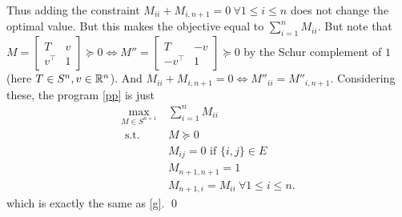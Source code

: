 \begin{enumerate}[leftmargin=*]
\begin{pf}
Thus adding the constraint $M_{ii} + M_{i,n+1}=0~\forall 1\le i\le n$ does not change the optimal value. But this makes the objective equal to $\sum_{i=1}^{n}M_{ii}$. But note that $M = \begin{bmatrix}T&v\\v^{\top}&1\end{bmatrix} \succeq 0 \iff M''=\begin{bmatrix}T&-v\\-v^{\top}&1\end{bmatrix}\succeq 0$ by the Schur complement of $1$ (here $T\in S^{n}, v\in \mathbb{R}^{n}$). And $M_{ii}+M_{i,n+1}=0\iff M''_{ii} = M''_{i,n+1}$.  Considering these, the program \ref{pp} is just
\begin{align*}
\max _{M \in S^{n+1}} &~\sum_{i=1}^{n} M_{i i} \\
\text { s.t. }&~ M\succeq 0\\
&~ M_{ij} = 0 \text { if }\{i, j\} \in E\\
&~ M_{n+1,n+1} = 1\\
&~M_{n+1, i}=M_{i i}~\forall 1\le i \le n.
\end{align*}
which is exactly the same as \ref{g}.
\qed\end{pf}


\end{enumerate}
